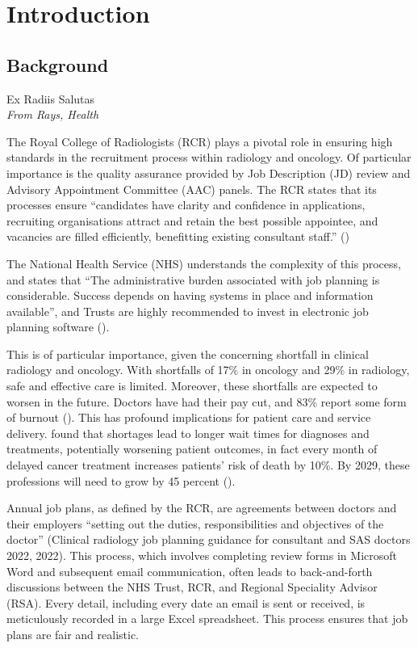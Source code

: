 \chapter{Introduction}
\section{Background} \label{Background}
\epigraph{Ex Radiis Salutas\\\textit{From Rays, Health}}{}
The Royal College of Radiologists (RCR) plays a pivotal role in ensuring high standards in the recruitment process within radiology and oncology. Of particular importance is the quality assurance provided by Job Description (JD) review and Advisory Appointment Committee (AAC) panels. The RCR states that its processes ensure “candidates have clarity and confidence in applications, recruiting organisations attract and retain the best possible appointee, and vacancies are filled efficiently, benefitting existing consultant staff.” (\cite{the_royal_college_of_radiologists_clinical_2022}) 

The National Health Service (NHS) understands the complexity of this process, and states that “The administrative burden associated with job planning is considerable. Success depends on having systems in place and information available”, and Trusts are highly recommended to invest in electronic job planning software (\cite{the_national_health_service_consultant_2017}).

This is of particular importance, given the concerning shortfall in clinical radiology and oncology. With shortfalls of 17\% in oncology and 29\% in radiology, safe and effective care is limited. Moreover, these shortfalls are expected to worsen in the future. Doctors have had their pay cut, and 83\% report some form of burnout (\cite{the_royal_college_of_radiologists_rcr_2023}). This has profound implications for patient care and service delivery. \textcite{limb_shortages_2022} found that shortages lead to longer wait times for diagnoses and treatments, potentially worsening patient outcomes, in fact every month of delayed cancer treatment increases patients’ risk of death by 10\%. By 2029, these professions will need to grow by 45 percent (\cite{the_national_health_service_strategic_2018}).

Annual job plans, as defined by the RCR, are agreements between doctors and their employers “setting out the duties, responsibilities and objectives of the doctor” (Clinical radiology job planning guidance for consultant and SAS doctors 2022, 2022). This process, which involves completing review forms in Microsoft Word and subsequent email communication, often leads to back-and-forth discussions between the NHS Trust, RCR, and Regional Speciality Advisor (RSA). Every detail, including every date an email is sent or received, is meticulously recorded in a large Excel spreadsheet. This process ensures that job plans are fair and realistic.

